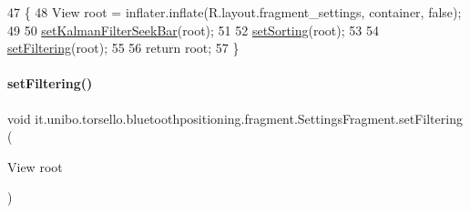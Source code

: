 \begin{DoxyCode}
47                                                                                                       \{
48         View root = inflater.inflate(R.layout.fragment\_settings, container, \textcolor{keyword}{false});
49 
50         \hyperlink{classit_1_1unibo_1_1torsello_1_1bluetoothpositioning_1_1fragment_1_1SettingsFragment_a84057f1633708ec85de5968ed9e7f032_a84057f1633708ec85de5968ed9e7f032}{setKalmanFilterSeekBar}(root);
51 
52         \hyperlink{classit_1_1unibo_1_1torsello_1_1bluetoothpositioning_1_1fragment_1_1SettingsFragment_ae29f0b3d6fc60f1ceeab5dcc530166c1_ae29f0b3d6fc60f1ceeab5dcc530166c1}{setSorting}(root);
53 
54         \hyperlink{classit_1_1unibo_1_1torsello_1_1bluetoothpositioning_1_1fragment_1_1SettingsFragment_a0d7b911602439aaf2a9ee4d5f9e41088_a0d7b911602439aaf2a9ee4d5f9e41088}{setFiltering}(root);
55 
56         \textcolor{keywordflow}{return} root;
57     \}
\end{DoxyCode}
\hypertarget{classit_1_1unibo_1_1torsello_1_1bluetoothpositioning_1_1fragment_1_1SettingsFragment_a0d7b911602439aaf2a9ee4d5f9e41088_a0d7b911602439aaf2a9ee4d5f9e41088}{}\label{classit_1_1unibo_1_1torsello_1_1bluetoothpositioning_1_1fragment_1_1SettingsFragment_a0d7b911602439aaf2a9ee4d5f9e41088_a0d7b911602439aaf2a9ee4d5f9e41088} 
\paragraph{\texorpdfstring{set\+Filtering()}{setFiltering()}}
{\footnotesize\ttfamily void it.\+unibo.\+torsello.\+bluetoothpositioning.\+fragment.\+Settings\+Fragment.\+set\+Filtering (\begin{DoxyParamCaption}\item[{View}]{root }\end{DoxyParamCaption})\hspace{0.3cm}{\ttfamily [private]}}


